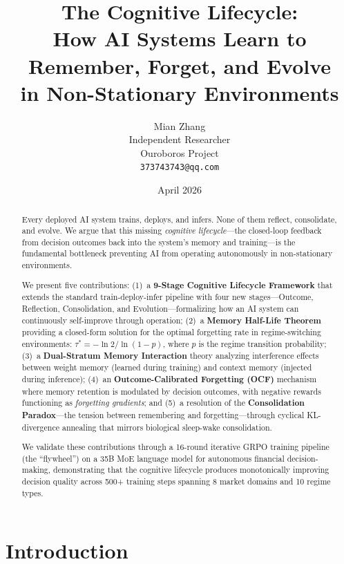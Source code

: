 \documentclass[11pt, a4paper]{article}
\title{\textbf{The Cognitive Lifecycle:\\How AI Systems Learn to Remember, Forget, and Evolve\\in Non-Stationary Environments}}
\author{
  Mian Zhang\\
  Independent Researcher\\
  Ouroboros Project\\
  \texttt{373743743@qq.com}
}
\date{April 2026}
\begin{document}
\maketitle

\begin{abstract}
Every deployed AI system trains, deploys, and infers. None of them reflect, consolidate, and evolve. We argue that this missing \emph{cognitive lifecycle}---the closed-loop feedback from decision outcomes back into the system's memory and training---is the fundamental bottleneck preventing AI from operating autonomously in non-stationary environments.

We present five contributions: (1)~a \textbf{9-Stage Cognitive Lifecycle Framework} that extends the standard train-deploy-infer pipeline with four new stages---Outcome, Reflection, Consolidation, and Evolution---formalizing how an AI system can continuously self-improve through operation; (2)~a \textbf{Memory Half-Life Theorem} providing a closed-form solution for the optimal forgetting rate in regime-switching environments: $\tau^* = -\ln 2 / \ln(1-p)$, where $p$ is the regime transition probability; (3)~a \textbf{Dual-Stratum Memory Interaction} theory analyzing interference effects between weight memory (learned during training) and context memory (injected during inference); (4)~an \textbf{Outcome-Calibrated Forgetting (OCF)} mechanism where memory retention is modulated by decision outcomes, with negative rewards functioning as \emph{forgetting gradients}; and (5)~a resolution of the \textbf{Consolidation Paradox}---the tension between remembering and forgetting---through cyclical KL-divergence annealing that mirrors biological sleep-wake consolidation.

We validate these contributions through a 16-round iterative GRPO training pipeline (the ``flywheel'') on a 35B MoE language model for autonomous financial decision-making, demonstrating that the cognitive lifecycle produces monotonically improving decision quality across 500+ training steps spanning 8 market domains and 10 regime types.

\end{abstract}


\section{Introduction}
\end{document}
